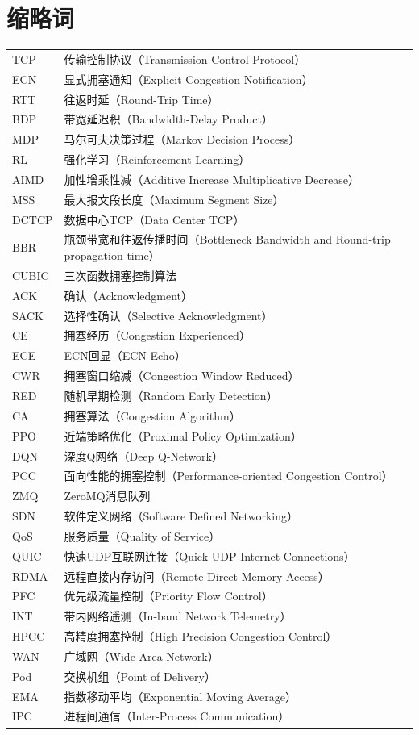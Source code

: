 \section*{缩略词}
\begin{supertabular}{p{3cm}p{10cm}}
TCP & 传输控制协议（Transmission Control Protocol） \\
ECN & 显式拥塞通知（Explicit Congestion Notification） \\
RTT & 往返时延（Round-Trip Time） \\
BDP & 带宽延迟积（Bandwidth-Delay Product） \\
MDP & 马尔可夫决策过程（Markov Decision Process） \\
RL & 强化学习（Reinforcement Learning） \\
AIMD & 加性增乘性减（Additive Increase Multiplicative Decrease） \\
MSS & 最大报文段长度（Maximum Segment Size） \\
DCTCP & 数据中心TCP（Data Center TCP） \\
BBR & 瓶颈带宽和往返传播时间（Bottleneck Bandwidth and Round-trip propagation time） \\
CUBIC & 三次函数拥塞控制算法 \\
ACK & 确认（Acknowledgment） \\
SACK & 选择性确认（Selective Acknowledgment） \\
CE & 拥塞经历（Congestion Experienced） \\
ECE & ECN回显（ECN-Echo） \\
CWR & 拥塞窗口缩减（Congestion Window Reduced） \\
RED & 随机早期检测（Random Early Detection） \\
CA & 拥塞算法（Congestion Algorithm） \\
PPO & 近端策略优化（Proximal Policy Optimization） \\
DQN & 深度Q网络（Deep Q-Network） \\
PCC & 面向性能的拥塞控制（Performance-oriented Congestion Control） \\
ZMQ & ZeroMQ消息队列 \\
SDN & 软件定义网络（Software Defined Networking） \\
QoS & 服务质量（Quality of Service） \\
QUIC & 快速UDP互联网连接（Quick UDP Internet Connections） \\
RDMA & 远程直接内存访问（Remote Direct Memory Access） \\
PFC & 优先级流量控制（Priority Flow Control） \\
INT & 带内网络遥测（In-band Network Telemetry） \\
HPCC & 高精度拥塞控制（High Precision Congestion Control） \\
WAN & 广域网（Wide Area Network） \\
Pod & 交换机组（Point of Delivery） \\
EMA & 指数移动平均（Exponential Moving Average） \\
IPC & 进程间通信（Inter-Process Communication） \\
\end{supertabular}
